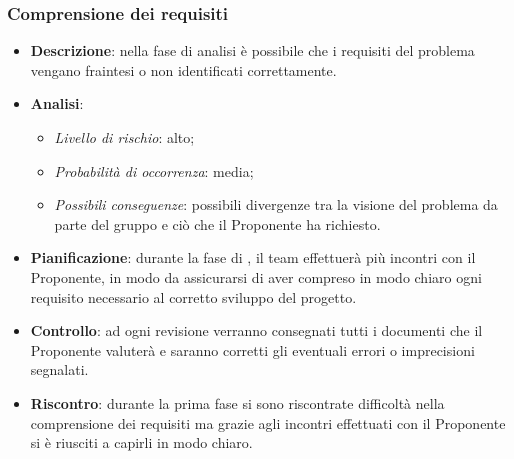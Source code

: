 		\subsubsection{Comprensione dei requisiti}
			\begin{itemize}
				\item \textbf{Descrizione}: nella fase di analisi è possibile che i requisiti del problema vengano fraintesi o non identificati correttamente. 
				\item \textbf{Analisi}:
				\begin{itemize}
					\item \textit{Livello di rischio}: alto;
					\item \textit{Probabilità di occorrenza}: media;
					\item \textit{Possibili conseguenze}: possibili divergenze tra la visione del problema da parte del gruppo e ciò che il Proponente ha richiesto.
				\end{itemize}
				\item \textbf{Pianificazione}: durante la fase di , il team effettuerà più incontri con il Proponente, in modo da assicurarsi di aver compreso in modo chiaro ogni requisito necessario al corretto sviluppo del progetto.
				\item \textbf{Controllo}: ad ogni revisione verranno consegnati tutti i documenti che il Proponente valuterà e saranno corretti gli eventuali errori o imprecisioni segnalati.
				\item \textbf{Riscontro}: durante la prima fase si sono riscontrate difficoltà nella comprensione dei requisiti ma grazie agli incontri effettuati con il Proponente si è riusciti a capirli in modo chiaro.
			\end{itemize}